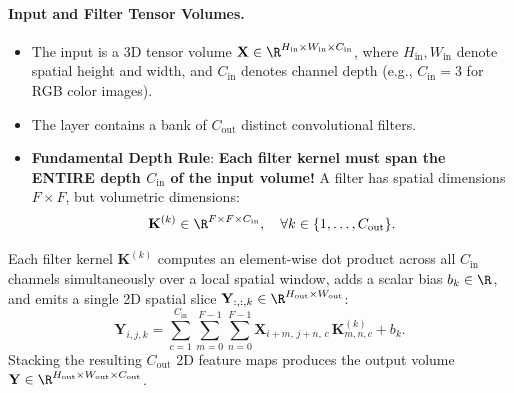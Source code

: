 \paragraph{Input and Filter Tensor Volumes.}
\begin{itemize}
  \item The input is a 3D tensor volume $\mathbf{X} \in \R^{H_{\text{in}} \times W_{\text{in}} \times C_{\text{in}}}$, where $H_{\text{in}}, W_{\text{in}}$ denote spatial height and width, and $C_{\text{in}}$ denotes channel depth (e.g., $C_{\text{in}} = 3$ for RGB color images).
  \item The layer contains a bank of $C_{\text{out}}$ distinct convolutional filters.
  \item \textbf{Fundamental Depth Rule}: \textbf{Each filter kernel must span the ENTIRE depth $C_{\text{in}}$ of the input volume!} A filter has spatial dimensions $F \times F$, but volumetric dimensions:
    \begin{equation}
    \mathbf{K}^{(k)} \in \R^{F \times F \times C_{\text{in}}}, \quad \forall k \in \{1, \dots, C_{\text{out}}\}.
    \end{equation}
\end{itemize}

Each filter kernel $\mathbf{K}^{(k)}$ computes an element-wise dot product across all $C_{\text{in}}$ channels simultaneously over a local spatial window, adds a scalar bias $b_k \in \R$, and emits a single 2D spatial slice $\mathbf{Y}_{:,:,k} \in \R^{H_{\text{out}} \times W_{\text{out}}}$:
\begin{equation}
\mathbf{Y}_{i, j, k} = \sum_{c=1}^{C_{\text{in}}} \sum_{m=0}^{F-1} \sum_{n=0}^{F-1} \mathbf{X}_{i+m, \, j+n, \, c} \, \mathbf{K}^{(k)}_{m, n, c} + b_k.
\label{eq:multichannel_convolution}
\end{equation}
Stacking the resulting $C_{\text{out}}$ 2D feature maps produces the output volume $\mathbf{Y} \in \R^{H_{\text{out}} \times W_{\text{out}} \times C_{\text{out}}}$.

